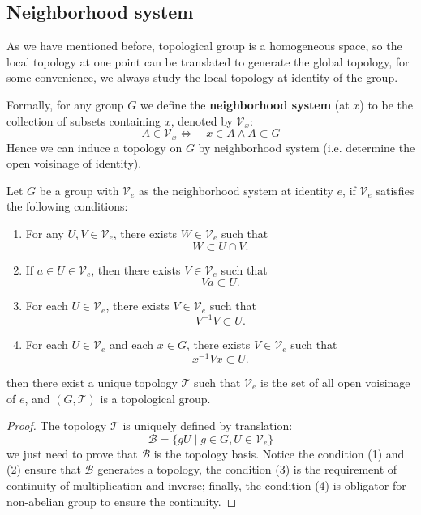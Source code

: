 \subsection*{Neighborhood system}

As we have mentioned before, topological group is a homogeneous space, so the local topology at one point can be translated to generate the global topology, for some convenience, we always study the local topology at identity of the group.

Formally, for any group \(G\) we define the \textbf{neighborhood system} (at \(x\)) to be the collection of subsets containing \(x\), denoted by \(\mathcal{V}_x\):
\[  A \in \mathcal{V}_x \iff \quad x \in A \land A \subset G\]
Hence we can induce a topology on \(G\) by neighborhood system (i.e. determine the open voisinage of identity).
\begin{proposition}
    Let \(G\) be a group with \(\mathcal{V}_e\) as the neighborhood system at identity \(e\), if \(\mathcal{V}_e\) satisfies the following conditions:
    \begin{enumerate}
    \item For any $U,V\in\mathcal{V}_e$, there exists $W\in\mathcal{V}_e$ such that 
    \[
    W \subset U\cap V.
    \]

    \item If $a\in U\in\mathcal{V}_e$, then there exists $V\in\mathcal{V}_e$ such that 
    \[
    Va \subset U.
    \]

    \item For each $U\in\mathcal{V}_e$, there exists $V\in\mathcal{V}_e$ such that 
    \[
    V^{-1}V \subset U.
    \]

    \item For each $U\in\mathcal{V}_e$ and each $x\in G$, there exists $V\in\mathcal{V}_e$ such that 
    \[
    x^{-1} V x \subset U.
    \]
\end{enumerate}
then there exist a unique topology \(\mathcal{T}\) such that \(\mathcal{V}_{e}\) is the set of all open voisinage of \(e\), and \((G,\mathcal{T})\) is a topological group.

\begin{proof}
    The topology \(\mathcal{T}\) is uniquely defined by translation:
    \[\mathcal{B} = \{gU \mid g \in G, U \in \mathcal{V}_e\}\]
    we just need to prove that \(\mathcal{B}\) is the topology basis. Notice the condition (1) and (2) ensure that \(\mathcal{B}\) generates a topology, the condition (3) is the requirement of continuity of multiplication and inverse; finally, the condition (4) is obligator for non-abelian group to ensure the continuity.
\end{proof}
\end{proposition} 
